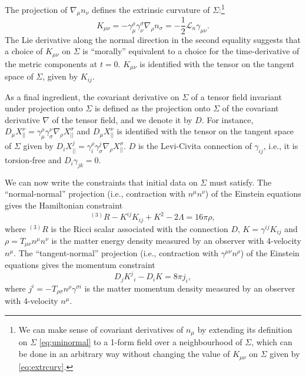 \documentclass[a4paper,11pt]{article}
\numberwithin{equation}{section}
\begin{document}
The projection of $\nabla_\mu n_\nu$ defines the extrinsic curvature of $\Sigma$:\footnote{We can make sense of covariant derivatives of $n_\mu$ by extending its definition on $\Sigma$ \eqref{eq:uninormal} to a 1-form field over a neighbourhood of $\Sigma$, which can be done in an arbitrary way without changing the value of $K_{\mu\nu}$ on $\Sigma$ given by \eqref{eq:extrcurv}.}
\begin{equation}
\label{eq:extrcurv}
K_{\mu\nu}=-\gamma^\rho_\mu \gamma^\sigma_\nu \nabla_\rho n_\sigma=-\frac{1}{2}\mathcal{L}_n\gamma_{\mu\nu}.
\end{equation}
The Lie derivative along the normal direction in the second equality suggests that a choice of $K_{\mu\nu}$ on $\Sigma$ is ``morally'' equivalent to a choice for the time-derivative of the metric components at $t=0$. $K_{\mu\nu}$ is identified with the tensor on the tangent space of $\Sigma$, given by $K_{ij}$.

As a final ingredient, the covariant derivative on $\Sigma$ of a tensor field invariant under projection onto $\Sigma$ is defined as the projection onto $\Sigma$ of the covariant derivative $\nabla$ of the tensor field, and we denote it by $D$. For instance, $D_\mu X_{||}^\nu=\gamma^\rho_\mu \gamma^\nu_\sigma \nabla_\rho X_{||}^\sigma$ and $D_\mu X_{||}^\nu$ is identified with the tensor on the tangent space of $\Sigma$ given by $D_i X_{||}^j=\gamma^\rho_i \gamma^j_\sigma \nabla_\rho X_{||}^\sigma$. $D$ is the Levi-Civita connection of $\gamma_{ij}$, i.e., it is torsion-free and $D_i\gamma_{jk}=0$.

We can now write the constraints that initial data on $\Sigma$ must satisfy. The ``normal-normal'' projection (i.e., contraction with $n^\mu n^\nu$) of the Einstein equations gives the Hamiltonian constraint
\begin{equation}
\label{eq:hamconstr}
^{(3)}R-K^{ij}K_{ij}+K^2-2\Lambda=16\pi\rho,
\end{equation}
where $^{(3)}R$ is the Ricci scalar associated with the connection $D$, $K=\gamma^{ij}K_{ij}$ and $\rho=T_{\mu\nu}n^\mu n^\nu$ is the matter energy density measured by an observer with 4-velocity $n^\mu$.
The ``tangent-normal'' projection (i.e., contraction with $\gamma^{\mu\nu} n^\rho$) of the Einstein equations gives the momentum constraint
\begin{equation}
\label{eq:momconstr}
D_j {K^j}_i-D_i K=8\pi j_i,
\end{equation}
where $j^i=-T_{\rho\sigma}n^\rho\gamma^{\sigma i}$ is the matter momentum density measured by an observer with 4-velocity $n^\mu$. %
\end{document}
